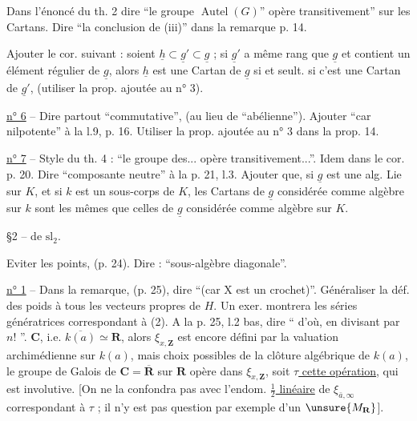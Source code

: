 Dans l'énoncé du th. 2 dire ``le groupe $\operatorname{Autel}(G)$'' opère transitivement'' sur les Cartans. Dire ``la conclusion de (iii)'' dans la remarque p. 14.

Ajouter le cor. suivant : soient $\underline h\subset\underline g'\subset\underline g$ ; si $\underline g'$ a même rang que $\underline g$ et contient un élément régulier de $\underline g$, alors $\underline h$ est une Cartan de $\underline g$ si et seult. si c'est une Cartan de $\underline g'$, (utiliser la prop. ajoutée au n° 3).

\uline{n° 6} -- Dire partout ``commutative'', (au lieu de ``abélienne''). Ajouter ``car nilpotente'' à la l.9, p. 16. Utiliser la prop. ajoutée au n° 3 dans la prop. 14.

\uline{n° 7} -- Style du th. 4 : ``le groupe des... opère transitivement...''. Idem dans le cor. p. 20. Dire ``composante neutre'' à la p. 21, l.3. Ajouter que, si $\underline g$ est une alg. Lie sur $K$, et si $k$ est un sous-corps de $K$, les Cartans de $\underline g$ considérée comme algèbre sur $k$ sont les mêmes que celles de $\underline g$ considérée comme algèbre sur $K$.

\S 2 --  de $\mathrm{sl}_2$.

Eviter les points, (p. 24). Dire : ``sous-algèbre diagonale''.

\uline{n° 1} -- Dans la remarque, (p. 25), dire ``(car X est un crochet)''. Généraliser la déf. des poids à tous les vecteurs propres de $H$. Un exer. montrera les séries génératrices correspondant à (2). A la p. 25, l.2 bas, dire `` d'où, en divisant par $n!$ ''.
$\mathbf C$, i.e. $\overline{k(a)}\simeq\mathbf R$,  alors $\xi_{x,\mathbf Z}$ est encore défini par la valuation archimédienne sur $k(a)$, mais    choix possibles de la clôture algébrique de $k(a)$, le groupe de Galois de $\mathbf C=\overline{\mathbf R}$ sur $\mathbf R$ opère dans $\xi_{x,\mathbf Z}$, soit \uline{$\tau$ cette opération}, qui est involutive.  [On ne la confondra pas avec l'endom. \uline{$\frac12$ linéaire} de $\xi_{\bar a,\infty}$ correspondant à $\tau$ ; il n'y est pas question par exemple d'un  $\unsure{M_{\mathbf R}}$].


